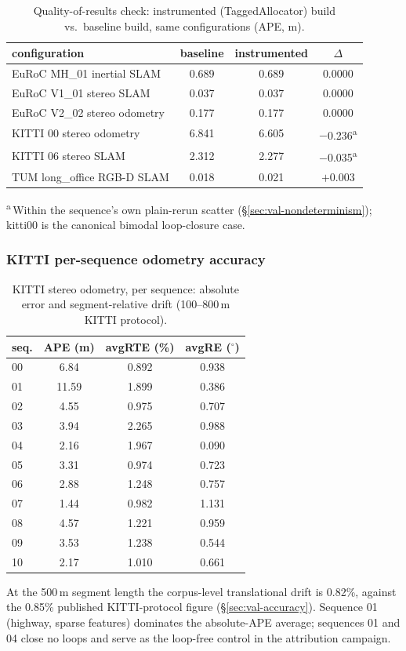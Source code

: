 \begin{table}[h]
\centering
\caption{Quality-of-results check: instrumented (TaggedAllocator) build vs.\
baseline build, same configurations (APE, m).}
\label{tab:qor}
\begin{tabular}{@{}lccc@{}}
\toprule
configuration & baseline & instrumented & $\Delta$ \\
\midrule
EuRoC MH\_01 inertial SLAM & 0.689 & 0.689 & 0.0000 \\
EuRoC V1\_01 stereo SLAM & 0.037 & 0.037 & 0.0000 \\
EuRoC V2\_02 stereo odometry & 0.177 & 0.177 & 0.0000 \\
KITTI 00 stereo odometry & 6.841 & 6.605 & $-$0.236\textsuperscript{a} \\
KITTI 06 stereo SLAM & 2.312 & 2.277 & $-$0.035\textsuperscript{a} \\
TUM long\_office RGB-D SLAM & 0.018 & 0.021 & $+$0.003 \\
\bottomrule
\end{tabular}

\smallskip
\raggedright\footnotesize \textsuperscript{a}\,Within the sequence's own
plain-rerun scatter (\S\ref{sec:val-nondeterminism}); kitti00 is the
canonical bimodal loop-closure case.
\end{table}

\subsubsection{KITTI per-sequence odometry accuracy}

\begin{table}[h]
\centering
\caption{KITTI stereo odometry, per sequence: absolute error and
segment-relative drift (100--800\,m KITTI protocol).}
\label{tab:kitti}
\begin{tabular}{@{}lccc@{}}
\toprule
seq. & APE (m) & avgRTE (\%) & avgRE ($^\circ$) \\
\midrule
00 & 6.84 & 0.892 & 0.938 \\
01 & 11.59 & 1.899 & 0.386 \\
02 & 4.55 & 0.975 & 0.707 \\
03 & 3.94 & 2.265 & 0.988 \\
04 & 2.16 & 1.967 & 0.090 \\
05 & 3.31 & 0.974 & 0.723 \\
06 & 2.88 & 1.248 & 0.757 \\
07 & 1.44 & 0.982 & 1.131 \\
08 & 4.57 & 1.221 & 0.959 \\
09 & 3.53 & 1.238 & 0.544 \\
10 & 2.17 & 1.010 & 0.661 \\
\bottomrule
\end{tabular}

\smallskip
\raggedright\footnotesize At the 500\,m segment length the corpus-level
translational drift is 0.82\%, against the 0.85\% published KITTI-protocol
figure (\S\ref{sec:val-accuracy}). Sequence 01 (highway, sparse features)
dominates the absolute-APE average; sequences 01 and 04 close no loops and
serve as the loop-free control in the attribution campaign.
\end{table}

